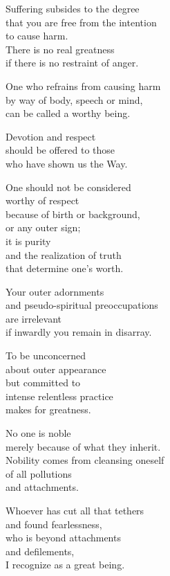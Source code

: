 Suffering subsides to the degree\\
that you are free from the intention\\
to cause harm.\\
There is no real greatness\\
if there is no restraint of anger.


One who refrains from causing harm\\
by way of body, speech or mind,\\
can be called a worthy being.


Devotion and respect\\
should be offered to those\\
who have shown us the Way.


One should not be considered\\
worthy of respect\\
because of birth or background,\\
or any outer sign;\\
it is purity\\
and the realization of truth\\
that determine one's worth.


Your outer adornments\\
and pseudo-spiritual preoccupations\\
are irrelevant\\
if inwardly you remain in disarray.


To be unconcerned\\
about outer appearance\\
but committed to\\
intense relentless practice\\
makes for greatness.


No one is noble\\
merely because of what they inherit.\\
Nobility comes from cleansing oneself\\
of all pollutions\\
and attachments.


Whoever has cut all that tethers\\
and found fearlessness,\\
who is beyond attachments\\
and defilements,\\
I recognize as a great being.


